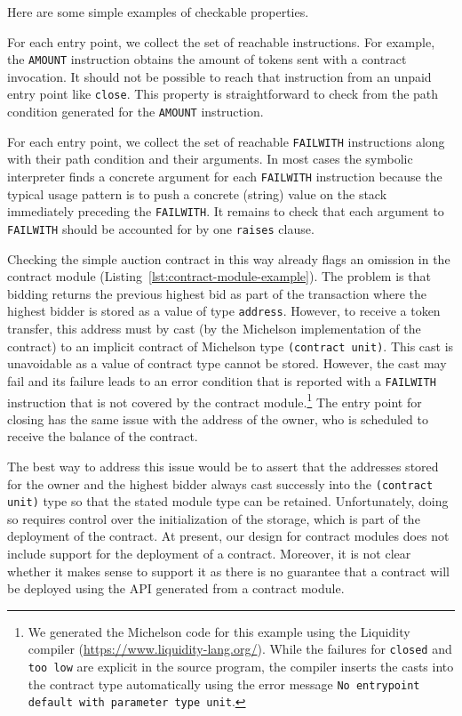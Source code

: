 \documentclass[a4paper,USenglish,american,cleveref, autoref, thm-restate]{oasics-v2021}
\begin{document}
Here are some simple examples of checkable properties.

For each entry point, we collect the set of reachable instructions.
For example, the  \lstinline/AMOUNT/ instruction obtains the amount of
tokens sent with a contract invocation.
It should not be possible to reach that instruction from an unpaid
entry point  like \lstinline/close/. This property is straightforward
to check from the path condition generated for the \lstinline/AMOUNT/
instruction. 

For each entry point, we collect the set of reachable \lstinline/FAILWITH/ instructions along with
their path condition and their arguments. In most cases the symbolic interpreter finds a concrete
argument for each \lstinline/FAILWITH/ instruction because the typical usage pattern is to push a
concrete (string) value on the stack immediately preceding the \lstinline/FAILWITH/.
It remains to check that each argument to \lstinline/FAILWITH/ should be accounted for by one
\lstinline/raises/ clause.

Checking the simple auction contract in this way already flags an
omission in the contract module
(Listing~\ref{lst:contract-module-example}). The problem is that
bidding returns the previous highest bid as part of the transaction
where the highest bidder is stored as a value of type
\lstinline/address/.  However, to receive a token transfer, this
address must by cast (by the Michelson implementation of the contract)
to an implicit contract of Michelson type \lstinline/(contract unit)/. This cast is unavoidable as a
value of contract type cannot be stored. However, the cast may fail and its failure leads to an
error condition that is reported with a \lstinline/FAILWITH/ instruction that is not covered by the
contract module.\footnote{We generated the Michelson code for this example using the Liquidity
  compiler (\url{https://www.liquidity-lang.org/}). While the failures for \lstinline/closed/ and
  \lstinline/too low/ are explicit in the source program, the compiler inserts the casts into the contract
  type automatically using the error message \texttt{No entrypoint default with parameter type
    unit}.}  The entry point for closing has the same issue with the address of the owner, who is
scheduled to receive the balance of the contract.

The best way to address this issue would be to assert that the addresses stored for the owner and
the highest bidder always cast successly into the \lstinline/(contract unit)/ type so that the
stated module type can be retained. Unfortunately, doing so requires control over the initialization
of the storage, which is part of the deployment of the contract. At present, our design for contract
modules does not include support for the deployment of a contract. Moreover, it is not clear whether
it makes sense to support it as there is no guarantee
that a contract will be deployed using the API generated from a contract module.
\end{document}
